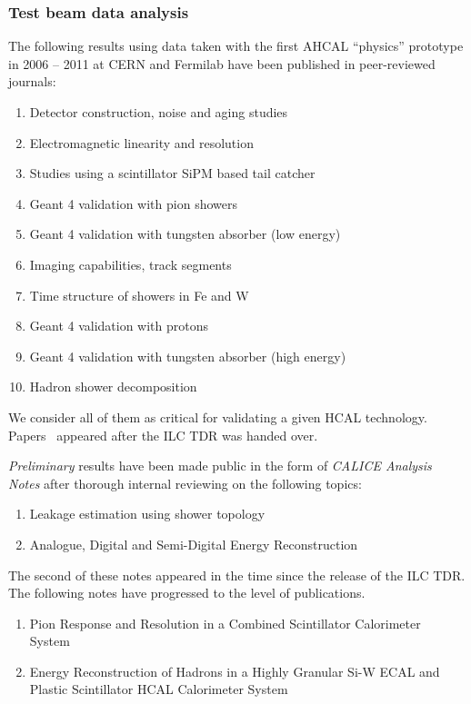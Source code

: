 \subsubsection{Test beam data analysis}
The following results using data taken with the first AHCAL ``physics'' prototype in 2006 -- 2011 at CERN and Fermilab have been published in peer-reviewed journals:
\begin{enumerate}
\item Detector construction, noise and aging studies~\cite{1748-0221-5-05-P05004}
\item Electromagnetic linearity and resolution~\cite{1748-0221-6-04-P04003}
\item Studies using a scintillator SiPM based tail catcher~\cite{1748-0221-7-04-P04015}
\item Geant 4 validation with pion showers~\cite{1748-0221-8-07-P07005}
\item Geant 4 validation with tungsten absorber (low energy)~\cite{1748-0221-9-01-P01004}
\item Imaging capabilities, track segments~\cite{1748-0221-8-09-P09001}
\item Time structure of showers in Fe and W~\cite{1748-0221-9-07-P07022}
\item Geant 4 validation with protons~\cite{1748-0221-10-04-P04014}
\item Geant 4 validation with tungsten absorber (high energy)~\cite{Blaising:2015nla}
\item Hadron shower decomposition~\cite{Price:2016sce}
\end{enumerate}

We consider all of them as critical for validating a given HCAL technology. Papers~\cite{1748-0221-8-07-P07005, 1748-0221-9-01-P01004, 1748-0221-8-09-P09001, 1748-0221-9-07-P07022, 1748-0221-10-04-P04014, Blaising:2015nla, Price:2016sce} appeared after the ILC TDR was handed over.

\emph{Preliminary} results have been made public in the form of \emph{CALICE Analysis Notes} after thorough internal reviewing on the following topics:
\begin{enumerate}
\item Leakage estimation using shower topology~\cite{Marchesini:CAN029}
\item Analogue, Digital and Semi-Digital Energy Reconstruction~\cite{Calice:CAN049}
\end{enumerate}
The second of these notes appeared in the time since the release of the ILC TDR.
The following notes have progressed to the level of publications.
\begin{enumerate}
	\item Pion Response and Resolution in a Combined Scintillator Calorimeter System~\cite{Repond:2018flg}
	\item Energy Reconstruction of Hadrons in a Highly Granular Si-W ECAL and Plastic Scintillator HCAL Calorimeter System~\cite{Israeli:2018byq}
\end{enumerate}
	
